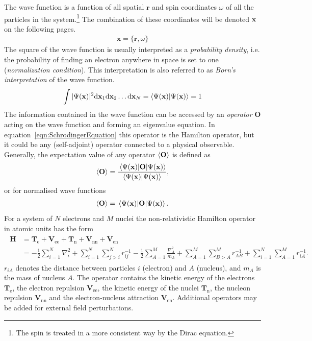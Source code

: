 The wave function is a function of all spatial $\mathbf{r}$ and spin
coordinates $\omega$ of all the particles in the system.\footnote{The spin
is treated in a more consistent way by the Dirac equation.} The combination of
these coordinates will be denoted $\mathbf{x}$ on the following pages.  
%
\begin{align}
	\mathbf{x}=\{\mathbf{r},\omega\}
\end{align}
%
The square of the wave function is usually interpreted as a \textit{probability
density}, i.e. the probability of finding an
electron anywhere in space is set to one (\textit{normalization condition}). This interpretation is also referred to as
\textit{Born's interpretation} of the wave
function.\autocite{Born_ZurQuantenmechanikStossvorgaenge_1926,Born_AdiabatenprinzipQuantenmechanik_1927}
%
\begin{align}
	\int |\Psi(\mathbf{x})|^2\dd \mathbf{x}_1\dd \mathbf{x}_2\ldots\dd \mathbf{x}_N=\braket{\Psi(\mathbf{x})}=1
\end{align}
%
The information contained in the wave function can be accessed by an \textit{operator}
$\mathbf{O}$ acting on the wave function and forming an eigenvalue equation. In
equation~\eqref{eqn:SchrodingerEquation} this operator is the Hamilton
operator, but it could be any (self-adjoint) operator connected to a physical observable.
Generally, the expectation value of any operator $\expval{\mathbf{O}}$ is
defined as
%
\begin{equation}
    \expval{\mathbf{O}}=\frac{\expval{\mathbf{O}}{\Psi(\mathbf{x})}}{\braket{\Psi(\mathbf{x})}},
\end{equation}
%
or for normalised wave functions
%
\begin{align}
    \expval{\mathbf{O}}=\expval{\mathbf{O}}{\Psi(\mathbf{x})}.
\end{align}
%
For a system of $N$ electrons and $M$ nuclei the non-relativistic Hamilton
operator in atomic units has the form
%
\begin{align}
\begin{aligned}
    \mathbf{H}&=\mathbf{T}_\text{e} + \mathbf{V}_\text{ee} + \mathbf{T}_\text{n} + \mathbf{V}_\text{nn} + \mathbf{V}_\text{en} \\
    &=-\frac{1}{2}\sum_{i=1}^N\nabla_i^2
    + \sum_{i=1}^N\sum_{j>i}^Nr_{ij}^{-1}
    -\frac{1}{2} \sum_{A=1}^M\frac{\nabla_A^2}{m_A}
    + \sum_{A=1}^M\sum_{B>A}^Mr_{AB}^{-1}
    + \sum_{i=1}^N\sum_{A=1}^Mr_{iA}^{-1}.\label{eqn:hamiltonoperator}
\end{aligned}
\end{align}
%
$r_{iA}$ denotes the distance between particles $i$ (electron) and $A$ (nucleus), and $m_A$ is the mass of nucleus $A$. 
The operator contains the kinetic energy of the electrons
$\mathbf{T}_\text{e}$, the electron repulsion $\mathbf{V}_\text{ee}$, the
kinetic energy of the nuclei $\mathbf{T}_\text{n}$, the nucleon repulsion
$\mathbf{V}_\text{nn}$ and the electron-nucleus attraction
$\mathbf{V}_\text{en}$. Additional operators may be added for external field perturbations.

